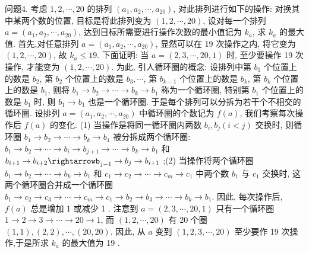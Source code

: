 问题4. 考虑 $1,2, \cdots, 20$ 的排列 $\left(a_1, a_2, \cdots, a_{20}\right)$, 对此排列进行如下的操作: 对换其中某两个数的位置, 目标是将此排列变为 $(1,2, \cdots, 20)$, 设对每一个排列 $a=\left(a_1, a_2, \cdots, a_{20}\right)$, 达到目标所需要进行操作次数的最小值记为 $k_a$, 求 $k_a$ 的最大值.
首先,对任意排列 $a=\left(a_1, a_2, \cdots, a_{20}\right)$, 显然可以在 19 次操作之内, 将它变为 $(1,2, \cdots, 20)$, 故 $k_a \leqslant 19$. 下面证明: 当 $a=(2,3, \cdots, 20,1)$ 时, 至少要操作 19 次操作, 才能变为 $(1,2, \cdots, 20)$. 为此, 引人循环圈的概念: 设排列中第 $b_1$ 个位置上的数是 $b_2$, 第 $b_2$ 个位置上的数是 $b_3, \cdots$, 第 $b_{k-1}$ 个位置上的数是 $b_k$, 第 $b_k$ 个位置上的数是 $b_1$, 则将 $b_1 \rightarrow b_2 \rightarrow \cdots \rightarrow b_k \rightarrow b_1$ 称为一个循环圈, 特别第 $b_1$ 个位置上的数是 $b_1$ 时, 则 $b_1 \rightarrow b_1$ 也是一个循环圈.
于是每个排列可以分拆为若干个不相交的循环圈.
设排列 $a=\left(a_1, a_2, \cdots, a_{20}\right)$ 中循环圈的个数记为 $f(a)$, 我们考察每次操作后 $f(a)$ 的变化.
(1) 当操作是将同一循环圈内两数 $b_i, b_j(i<j)$ 交换时, 则循环圈 $b_1 \rightarrow b_2 \rightarrow \cdots \rightarrow b_k \rightarrow b_1$ 被分拆成两个循环圈: $b_1 \rightarrow b_2 \rightarrow \cdots \rightarrow b_i \rightarrow b_{j+1} \rightarrow \cdots \rightarrow b_k \rightarrow b_1$ 和 $b_{i+1} \rightarrow b_{i+2} \rightarrowb_{j-1} \rightarrow b_j \rightarrow b_{i+1}$ ;(2) 当操作将两个循环圈 $b_1 \rightarrow b_2 \rightarrow \cdots \rightarrow b_k \rightarrow b_1$ 和 $c_1 \rightarrow c_2 \rightarrow \cdots \rightarrow c_m \rightarrow c_1$ 中两个数 $b_1$ 与 $c_1$ 交换时, 这两个循环圈合并成一个循环圈 $b_1 \rightarrow c_2 \rightarrow c_3 \rightarrow \cdots \rightarrow c_m \rightarrow c_1 \rightarrow b_2 \rightarrow b_3 \rightarrow \cdots \rightarrow b_k \rightarrow b_1$. 因此, 每次操作后, $f(a)$ 总是增加 1 或减少 1 . 注意到 $a=(2,3, \cdots, 20,1)$ 只有一个循环圈 $1 \rightarrow 2 \rightarrow 3 \rightarrow \cdots \rightarrow 20 \rightarrow 1$, 而 $(1,2, \cdots, 20)$ 有 20 个圈 $(1,1),(2,2), \cdots,(20,20)$. 因此, 从 $a$ 变到 $(1,2,3, \cdots, 20)$ 至少要作 19 次操作,于是所求 $k_a$ 的最大值为 19 .



